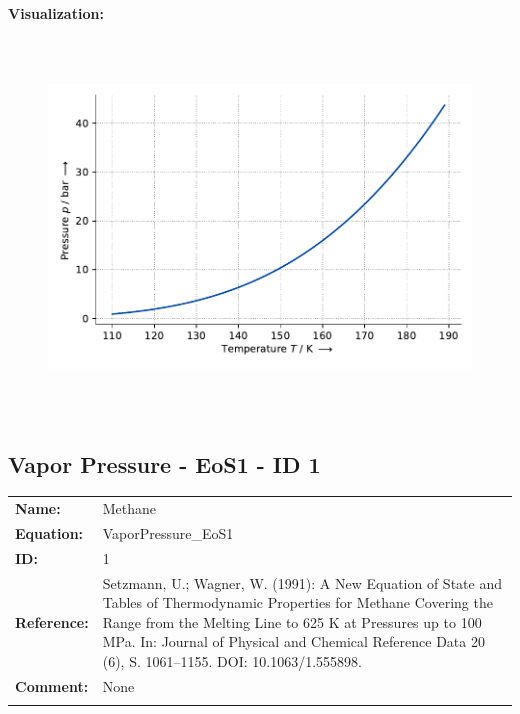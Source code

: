 \textbf{Visualization:}
%
\begin{figure}[!htp]
{\noindent\includegraphics[height=10cm, keepaspectratio]{figs/ref/ref_Methane_VaporPressure_Antoine_4.pdf}}
\end{figure}
%

\FloatBarrier
\newpage
\subsection{Vapor Pressure - EoS1 - ID 1}
%
\begin{tabular}[l]{|lp{11.5cm}|}
\hline
\addlinespace

\textbf{Name:} & Methane \\
\textbf{Equation:} & VaporPressure\_EoS1 \\
\textbf{ID:} & 1 \\
\textbf{Reference:} & Setzmann, U.; Wagner, W. (1991): A New Equation of State and Tables of Thermodynamic Properties for Methane Covering the Range from the Melting Line to 625 K at Pressures up to 100 MPa. In: Journal of Physical and Chemical Reference Data 20 (6), S. 1061–1155. DOI: 10.1063/1.555898. \\
\textbf{Comment:} & None \\

\addlinespace
\hline
\end{tabular}
\newline

